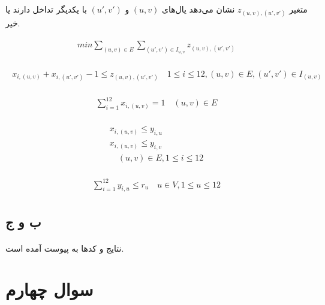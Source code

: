 \documentclass[paper=a4, fontsize=11pt]{article}
\numberwithin{equation}{section} %
\numberwithin{figure}{section} %
\numberwithin{table}{section} %
\begin{document}
\paragraph{}
متغیر $z_{(u,v),(u',v')}$
نشان می‌دهد یال‌های $(u,v)$ و $(u',v')$ با یکدیگر تداخل دارند یا خیر.

\begin{align}
\begin{split}
	min \sum_{(u,v) \in E}\sum_{(u',v') \in I_{u,v}} z_{(u,v),(u',v')}
\end{split}
\end{align}

\begin{align}
\begin{split}
	x_{i,(u,v)} + x_{i,(u',v')} - 1 \le z_{(u,v),(u',v')}
	\quad
	1 \le i \le 12, (u,v) \in E, (u',v') \in I_{(u,v)}
\end{split}
\end{align}

\begin{align}
\begin{split}
	\sum_{i=1}^{12} x_{i,(u,v)} = 1
	\quad (u,v) \in E
\end{split}
\end{align}

\begin{align}
\begin{split}
	x_{i,(u,v)} \le y_{i,u}\\
	x_{i,(u,v)} \le y_{i,v}\\
	\quad (u,v) \in E, 1 \le i \le 12
\end{split}
\end{align}

\begin{align}
\begin{split}
	\sum_{i=1}^{12} y_{i,u} \le r_u
	\quad u \in V, 1 \le u \le 12
\end{split}
\end{align}

\subsection{ب و ج}
\paragraph{}
نتایج و کدها به پیوست آمده است.

\section{سوال چهارم}
\end{document}
